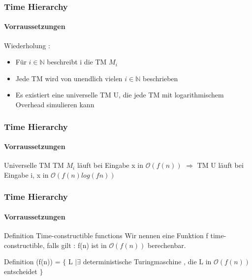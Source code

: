 \begin{frame}
	\frametitle{Time Hierarchy}
	\framesubtitle{Vorraussetzungen}
	Wiederholung :
	\begin{itemize}[<+->]
		\item Für $i\in \mathbb{N}$ beschreibt i die TM $M_i$
		\item Jede TM wird von unendlich vielen $i\in \mathbb{N}$ beschrieben
		\item Es existiert eine universelle TM U, die jede TM mit logarithmischem Overhead 					simulieren kann
	\end{itemize}
\end{frame}
\begin{frame}
	\frametitle{Time Hierarchy}
	\framesubtitle{Vorraussetzungen}
	\begin{KITexampleblock}{Universelle TM}
	TM $M_i$ läuft bei Eingabe x in $\mathcal{O}(f(n))$
	$\Rightarrow$ TM U läuft bei Eingabe i, x in $\mathcal{O}(f(n)log(fn))$
	\end{KITexampleblock}
\end{frame}
\begin{frame}
	\frametitle{Time Hierarchy}
	\framesubtitle{Vorraussetzungen}
	\begin{KITinfoblock}{Definition Time-constructible functions}
		Wir nennen eine Funktion f time-constructible, falls gilt : \newline
		f(n) ist in $\mathcal{O}(f(n))$ berechenbar. 
	\end{KITinfoblock}
	
	\bigskip
	\pause	
	
	\begin{KITinfoblock}{Definition \DTIME }
		\DTIME(f(n)) = $\lbrace$ L $\vert \exists$ deterministische Turingmaschine ,
		 die L in $\mathcal{O}(f(n))$ entscheidet $\rbrace$
	\end{KITinfoblock}
\end{frame}
